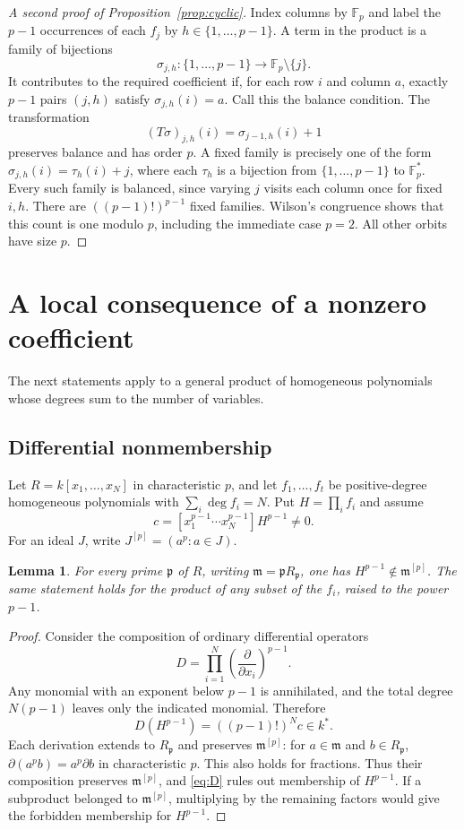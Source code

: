 \documentclass[11pt]{article}
\newtheorem{lemma}[theorem]{Lemma}
\theoremstyle{definition}\newtheorem{definition}[theorem]{Definition}
\theoremstyle{remark}\newtheorem{remark}[theorem]{Remark}
\newcommand{\F}{\mathbb F}
\newcommand{\m}{\mathfrak m}
\newcommand{\pp}{\mathfrak p}
\numberwithin{equation}{section}
\begin{document}
\begin{proof}[A second proof of Proposition~\ref{prop:cyclic}]
Index columns by $\F_p$ and label the $p-1$ occurrences of each
$f_j$ by $h\in\{1,\ldots,p-1\}$. A term in the product is a
family of bijections
\[
 \sigma_{j,h}:\{1,\ldots,p-1\}\longrightarrow\F_p\setminus\{j\}.
\]
It contributes to the required coefficient if, for each row $i$ and
column $a$, exactly $p-1$ pairs $(j,h)$ satisfy
$\sigma_{j,h}(i)=a$. Call this the balance condition. The transformation
\[
 (T\sigma)_{j,h}(i)=\sigma_{j-1,h}(i)+1
\]
preserves balance and has order $p$. A fixed family is precisely
one of the form $\sigma_{j,h}(i)=\tau_h(i)+j$, where each $\tau_h$
is a bijection from $\{1,\ldots,p-1\}$ to $\F_p^*$.
Every such family is balanced, since varying $j$ visits each column
once for fixed $i,h$. There are $((p-1)!)^{p-1}$ fixed families.
Wilson's congruence shows that this count is one modulo $p$,
including the immediate case $p=2$. All other orbits have size $p$.
\end{proof}

\section{A local consequence of a nonzero coefficient}
The next statements apply to a general product of homogeneous
polynomials whose degrees sum to the number of variables.

\subsection{Differential nonmembership}
Let $R=k[x_1,\ldots,x_N]$ in characteristic $p$, and let
$f_1,\ldots,f_t$ be positive-degree homogeneous polynomials with
$\sum_i\deg f_i=N$. Put $H=\prod_i f_i$ and assume
\begin{equation}\label{eq:nonzero}
 c=[x_1^{p-1}\cdots x_N^{p-1}]H^{p-1}\ne0.
\end{equation}
For an ideal $J$, write $J^{[p]}=(a^p:a\in J)$.

\begin{lemma}\label{lem:diff}
For every prime $\pp$ of $R$, writing
$\m=\pp R_{\pp}$, one has $H^{p-1}\notin\m^{[p]}$.
The same statement holds for the product of any subset of the $f_i$,
raised to the power $p-1$.
\end{lemma}
\begin{proof}
Consider the composition of ordinary differential operators
\[
 D=\prod_{i=1}^{N}\left(\frac{\partial}{\partial x_i}\right)^{p-1}.
\]
Any monomial with an exponent below $p-1$ is annihilated, and the
total degree $N(p-1)$ leaves only the indicated monomial. Therefore
\begin{equation}\label{eq:D}
 D(H^{p-1})=((p-1)!)^N c\in k^*.
\end{equation}
Each derivation extends to $R_{\pp}$ and preserves $\m^{[p]}$:
for $a\in\m$ and $b\in R_{\pp}$,
$\partial(a^pb)=a^p\partial b$ in characteristic $p$.
This also holds for fractions. Thus their composition preserves
$\m^{[p]}$, and \eqref{eq:D} rules out membership of $H^{p-1}$.
If a subproduct belonged to $\m^{[p]}$, multiplying by the remaining
factors would give the forbidden membership for $H^{p-1}$.
\end{proof}
\end{document}
